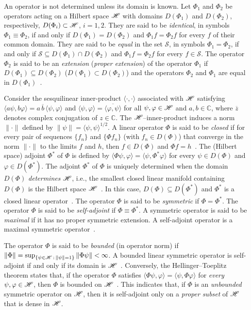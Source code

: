 \documentclass[amsa]{ipart}
\begin{document}
An operator is not determined unless its domain is known. Let $\Phi_1$
and $\Phi_2$ be operators acting on a Hilbert space $\mathscr{H}$ with domains
$D(\Phi_1)$ and $D(\Phi_2)$, 
respectively, $D(\Phi_i)\subset\mathscr{H}$, $i=1,2$. They are said to be
\emph{identical}, in symbols $\Phi_1\equiv\Phi_2$, if and only if $D(\Phi_1)=D(\Phi_2)$
and $\Phi_1 f=\Phi_2 f$ for every $f$ of their common domain. They are said
to be \emph{equal} in 
the set $\mathscr{S}$, in symbols $\Phi_1=\Phi_2$, if and only if
$\mathscr{S}\subseteq D(\Phi_1)\cap D(\Phi_2)$ and $\Phi_1 f=\Phi_2 f$ for every
$f\in\mathscr{S}$. The operator $\Phi_2$ is said to be an \emph{extension}
(\emph{proper extension}) of the operator $\Phi_1$ if $D(\Phi_1)\subseteq D(\Phi_2)$
($D(\Phi_1)\subset D(\Phi_2)$) and the operators $\Phi_2$ and $\Phi_1$ are equal in
$D(\Phi_1)$~\cite{Stone:64}.   


Consider the sesquilinear inner-product $\langle\cdot,\cdot\rangle$ associated with $\mathscr{H}$
satisfying $\langle a\psi,b\varphi\rangle=a\,\overline{b}\,\langle\psi,\varphi\rangle$ and
$\langle\psi,\varphi\rangle=\overline{\langle\varphi,\psi\rangle}$ for all $\psi,\varphi\in\mathscr{H}$ and $a,b\in\mathbb{C}$, where
$\overline{z}$ denotes complex conjugation of $z\in\mathbb{C}$.
The $\mathscr{H}$--inner-product induces a norm $\|\cdot\|$ defined by
$\|\psi\|=\langle\psi,\psi\rangle^{1/2}$. A linear operator $\Phi$ is said to be \emph{closed}
if for every pair of sequences $\{f_n\}$ and $\{\Phi f_n\}$ (with $f_n\in D(\Phi)$)
that converge in the norm $\|\cdot\|$ to the limits $f$ and $h$, then 
$f\in D(\Phi)$ and $\Phi f=h$~\cite{Stone:64}. The (Hilbert space) 
adjoint $\Phi^*$ of $\Phi$ is   
defined by $\langle\Phi\psi,\varphi\rangle=\langle\psi,\Phi^*\varphi\rangle$ for every $\psi\in D(\Phi)$ and $\varphi\in D(\Phi^*)$. The
adjoint $\Phi^*$ of $\Phi$ is uniquely determined when the domain $D(\Phi)$
\emph{determines} $\mathscr{H}$, i.e., the smallest closed linear manifold
containing $D(\Phi)$ is the Hilbert space $\mathscr{H}$~\cite{Stone:64}. In this
case, $D(\Phi)\subseteq D(\Phi^*)$ and $\Phi^*$ is a closed linear
operator~\cite{Stone:64}. The operator $\Phi$ is said to be
\emph{symmetric} if $\Phi=\Phi^*$. The operator $\Phi$ is said to be
\emph{self-adjoint} if $\Phi\equiv\Phi^*$. A symmetric operator is said to be
\emph{maximal} if it has no proper symmetric extension. A self-adjoint
operator is a maximal symmetric operator~\cite{Stone:64}. 



The operator $\Phi$ is said to be \emph{bounded} (in operator norm) if
$\|\Phi\|=\sup_{\{\psi\in\mathscr{H}   \,:\, \|\psi\|=1\}}\|\Phi\psi\|<\infty$. A bounded linear symmetric
operator is self-adjoint if and only if its domain is
$\mathscr{H}$~\cite{Stone:64}. Conversely, the Hellinger--Toeplitz theorem
states that, if the operator $\Phi$ satisfies $\langle\Phi\psi,\varphi\rangle=\langle\psi,\Phi\varphi\rangle$ for \emph{every}
$\psi,\varphi\in\mathscr{H}$, then $\Phi$ is bounded on
$\mathscr{H}$~\cite{Reed-1980,Stone:64}. This indicates that, if $\Phi$ is an
\emph{unbounded} symmetric operator on $\mathscr{H}$, then it is self-adjoint
only on a \emph{proper subset} of $\mathscr{H}$ that is dense in $\mathscr{H}$. 
\end{document}
